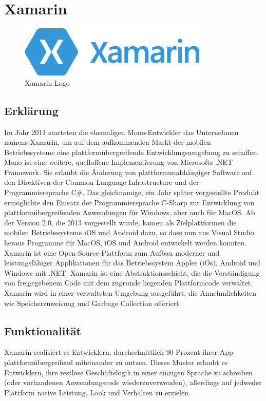 
\newpage

\section{Xamarin}
\cite{XML}
\begin{figure}[h]
    \begin{center}
        \includegraphics*[width=9cm]{pics/Xamarin_logo.png}
        \caption[Xamarin Logo]{Xamarin Logo \cite{XMLlogo}}
    \end{center}
\end{figure}
\subsection*{Erklärung}
Im Jahr 2011 starteten die ehemaligen Mono-Entwickler das Unternehmen 
namens Xamarin, um auf dem aufkommenden Markt der mobilen Betriebssysteme 
eine plattformübergreifende Entwicklungsumgebung zu schaffen. 
Mono ist eine weitere, quelloffene Implementierung von Microsofts .NET Framework. 
Sie erlaubt die Änderung von plattformunabhängiger Software auf den Direktiven 
der Common Language Infrastructure und der Programmiersprache C\#.
Das gleichnamige, ein Jahr später vorgestellte Produkt ermöglichte den 
Einsatz der Programmiersprache C-Sharp zur Entwicklung von 
plattformübergreifenden Anwendungen für Windows, aber auch für MacOS. 
Ab der Version 2.0, die 2013 vorgestellt wurde, kamen als Zielplattformen 
die mobilen Betriebssysteme iOS und Android dazu, so dass nun aus Visual 
Studio heraus Programme für MacOS, iOS und Android entwickelt werden 
konnten. 
Xamarin ist eine Open-Source-Plattform zum Aufbau moderner 
und leistungsfähiger Applikationen für das Betriebssystem Apples (iOs), 
Android und Windows mit .NET. Xamarin ist eine Abstraktionsschicht, 
die die Verständigung von freigegebenem Code mit dem zugrunde liegenden 
Plattformcode verwaltet. Xamarin wird in einer verwalteten Umgebung 
ausgeführt, die Annehmlichkeiten wie Speicherzuweisung und Garbage 
Collection offeriert.
\subsection*{Funktionalität}
Xamarin realisiert es Entwicklern, durchschnittlich 90 Prozent ihrer App 
plattformübergreifend miteinander zu nutzen. Dieses Muster erlaubt es 
Entwicklern, ihre restlose Geschäftslogik in einer einzigen Sprache 
zu schreiben (oder vorhandenen Anwendungscode wiederzuverwenden), 
allerdings auf jedweder Plattform native Leistung, Look und Verhalten 
zu erzielen.
